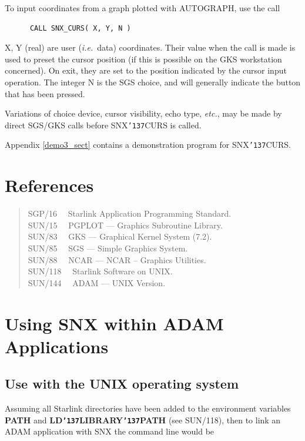 \documentclass[11pt]{article}
\renewcommand{\_}{{\tt\char'137}}     %
\begin{document}
To input coordinates from a graph plotted with AUTOGRAPH, use the call

\begin{verbatim}
      CALL SNX_CURS( X, Y, N )
\end{verbatim}

X, Y (real) are user ({\em i.e.}\ data) coordinates.
Their value when the call is made is used to preset the cursor
position (if this is possible on the GKS workstation concerned).
On exit, they are set to the position indicated by the
cursor input operation.
The integer N is the SGS choice, and will generally indicate the button
that has been pressed.

Variations of choice device, cursor visibility, echo type,
{\em etc.}, may be made by direct SGS/GKS calls before SNX\_CURS is called.

Appendix \ref{demo3_sect} contains a demonstration program for SNX\_CURS.


\section {References}

\begin{verse}
SGP/16 ~~Starlink Application Programming Standard.\\
SUN/15 ~~PGPLOT --- Graphics Subroutine Library.\\
SUN/83 ~~GKS --- Graphical Kernel System (7.2).\\
SUN/85 ~~SGS --- Simple Graphics System.\\
SUN/88 ~~NCAR --- NCAR -- Graphics Utilities.\\
SUN/118 ~~Starlink Software on UNIX.\\
SUN/144 ~~ADAM --- UNIX Version.
\end{verse}


\newpage
\appendix
\section {Using SNX within ADAM Applications} \label{adam_link}

\subsection {Use with the UNIX operating system}

\begin{sloppypar}
Assuming all Starlink directories have been added to the environment variables
{\bf PATH} and {\bf LD\_LIBRARY\_PATH} (see SUN/118), then to link an ADAM
application with SNX the command line would be
\end{sloppypar}
\end{document}
